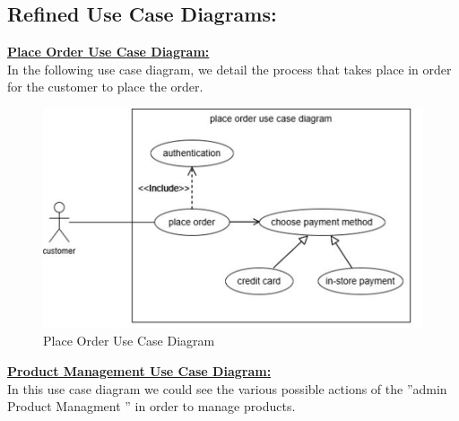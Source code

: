\subsection{Refined Use Case Diagrams:}

\underline{\textbf{Place Order Use Case Diagram:}}\\

In the following use case diagram, we detail the process that takes place in order for  the customer to place the order.\\

\newpage
\begin{figure}[!h]
\begin{center}
\includegraphics[width=13cm]{images/Place Order Use Case Diagram}
\end{center}
\caption{Place Order Use Case Diagram}
\end{figure}

\underline{\textbf{Product Management Use Case Diagram:}}\\

In this use case diagram we could see the various possible actions of the ”admin Product Managment ” in order to manage products.\\

